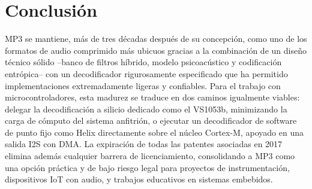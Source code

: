 \documentclass[pdflatex,sn-mathphys-num]{sn-jnl}%
\begin{document}

\section{Conclusión}\label{sec:conclusion}
MP3 se mantiene, más de tres décadas después de su concepción, como uno de los formatos de audio comprimido más ubicuos gracias a la combinación de un diseño técnico sólido --banco de filtros híbrido, modelo psicoacústico y codificación entrópica-- con un decodificador rigurosamente especificado que ha permitido implementaciones extremadamente ligeras y confiables. Para el trabajo con microcontroladores, esta madurez se traduce en dos caminos igualmente viables: delegar la decodificación a silicio dedicado como el VS1053b, minimizando la carga de cómputo del sistema anfitrión, o ejecutar un decodificador de software de punto fijo como Helix directamente sobre el núcleo Cortex-M, apoyado en una salida I2S con DMA. La expiración de todas las patentes asociadas en 2017 elimina además cualquier barrera de licenciamiento, consolidando a MP3 como una opción práctica y de bajo riesgo legal para proyectos de instrumentación, dispositivos IoT con audio, y trabajos educativos en sistemas embebidos.
\end{document}

